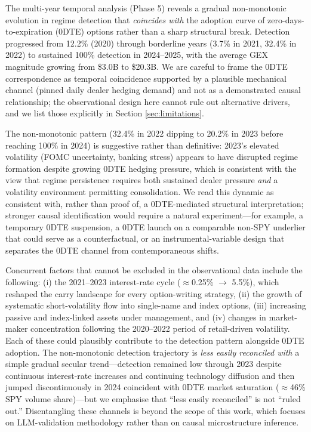 \documentclass[jrfm,article,accept,moreauthors,pdftex]{Definitions/mdpi}
\begin{document}
The multi-year temporal analysis (Phase 5) reveals a gradual non-monotonic evolution in regime detection that \textit{coincides with} the adoption curve of zero-days-to-expiration (0DTE) options rather than a sharp structural break. Detection progressed from 12.2\% (2020) through borderline years (3.7\% in 2021, 32.4\% in 2022) to sustained 100\% detection in \mbox{2024--2025}, with the average GEX magnitude growing from \$3.0B to \$20.3B. We are careful to frame the 0DTE correspondence as temporal coincidence supported by a plausible mechanical channel (pinned daily dealer hedging demand) and not as a demonstrated causal relationship; the observational design here cannot rule out alternative drivers, and we list those explicitly in {Section} \ref{sec:limitations}.%


The non-monotonic pattern (32.4\% in 2022 dipping to 20.2\% in 2023 before reaching 100\% in 2024) is suggestive rather than definitive: 2023's elevated volatility (FOMC uncertainty, banking stress) appears to have disrupted regime formation despite growing 0DTE hedging pressure, which is consistent with the view that regime persistence requires both sustained dealer pressure \textit{and} a volatility environment permitting consolidation. We read this dynamic as consistent with, rather than proof of, a 0DTE-mediated structural interpretation; stronger causal identification would require a natural experiment---for example, a temporary 0DTE suspension, a 0DTE launch on a comparable non-SPY underlier that could serve as a counterfactual, or an instrumental-variable design that separates the 0DTE channel from contemporaneous shifts.

Concurrent factors that cannot be excluded in the observational data include the following: (i) the 2021--2023 interest-rate cycle ($\approx$0.25\% $\rightarrow$ 5.5\%), which reshaped the carry landscape for every option-writing strategy, (ii) the growth of systematic short-volatility flow into single-name and index options, (iii) increasing passive and index-linked assets under management, and (iv) changes in market-maker concentration following the \mbox{2020--2022} period of retail-driven volatility. Each of these could plausibly contribute to the detection pattern alongside 0DTE adoption. The non-monotonic detection trajectory is \textit{less easily reconciled with} a simple gradual secular trend---detection remained low through 2023 despite continuous interest-rate increases and continuing technology diffusion and then jumped discontinuously in 2024 coincident with 0DTE market saturation ($\approx$46\% SPY volume share)---but we emphasise that ``less easily reconciled'' is not ``ruled out.'' Disentangling these channels is beyond the scope of this work, which focuses on LLM-validation methodology rather than on causal microstructure inference.
\end{document}
